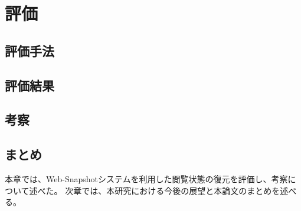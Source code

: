 \chapter{評価}
\label{chap:evaluation}


\section{評価手法}

\section{評価結果}
\section{考察}
\section{まとめ}
本章では、Web-Snapshotシステムを利用した閲覧状態の復元を評価し、考察について述べた。
次章では、本研究における今後の展望と本論文のまとめを述べる。